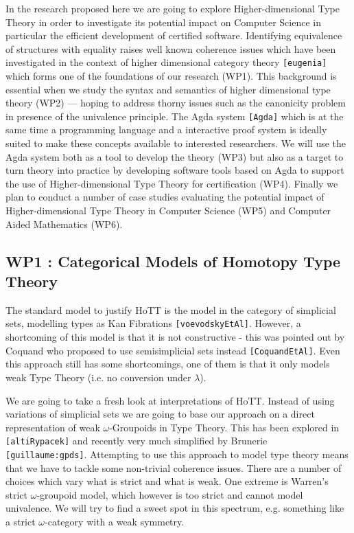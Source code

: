 \documentclass[twocolumn,a4paper,11pt]{article}
\renewcommand{\cite}[1]{{\tt[#1]}}
\begin{document}
In the research proposed here we are going to explore
Higher-dimensional Type Theory in order to investigate its potential
impact on Computer Science in particular the efficient development of
certified software. Identifying equivalence of structures with
equality raises well known coherence issues which have been
investigated in the context of higher dimensional category theory
\cite{eugenia} which forms one of the foundations of our research
(WP1). This background is essential when we study the syntax and
semantics of higher dimensional type theory (WP2) --- hoping to
address thorny issues such as the canonicity problem in presence of
the univalence principle. The Agda system \cite{Agda}
which is at the same time a programming language and a interactive
proof system is ideally suited to make these concepts available to
interested researchers. We will use the Agda system both as a tool to
develop the theory (WP3) but also as a target to turn theory into
practice by developing software tools based on Agda to support the use
of Higher-dimensional Type Theory for certification (WP4). Finally we
plan to conduct a number of case studies evaluating the potential
impact of Higher-dimensional Type Theory in Computer Science (WP5) and
Computer Aided Mathematics (WP6).

\subsection*{WP1 : Categorical Models of Homotopy Type Theory}

The standard model to justify HoTT is the model in the category of
simplicial sets, modelling types as Kan Fibrations
\cite{voevodskyEtAl}. However, a shortcoming of this model is that it
is not constructive - this was pointed out by Coquand who proposed to
use semisimplicial sets instead \cite{CoquandEtAl}. Even this approach
still has some shortcomings, one of them is that it only models weak
Type Theory (i.e. no conversion under $\lambda$).

We are going to take a fresh look at interpretations of HoTT. Instead
of using variations of simplicial sets we are going to base our
approach on a direct representation of weak $\omega$-Groupoids in Type
Theory. This has been explored in \cite{altiRypacek} and recently very
much simplified by Brunerie \cite{guillaume:gpds}. Attempting to use
this approach to model type theory means that we have to tackle some
non-trivial coherence issues. There are a number of choices
which vary what is strict and what is weak. One extreme is Warren's 
strict $\omega$-groupoid model, which however is too strict and cannot
model univalence. We will try to find a sweet spot in this spectrum,
e.g. something like a strict $\omega$-category with a weak symmetry.
\end{document}
